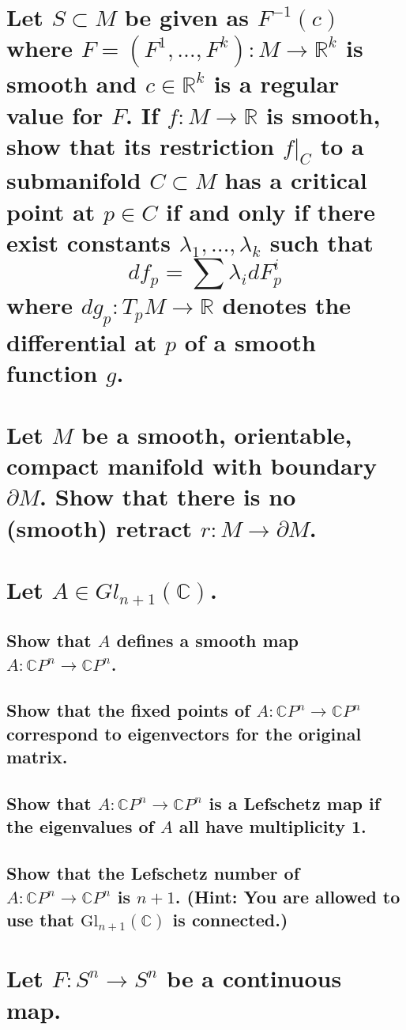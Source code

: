 \documentclass[10pt]{article}
\newcommand{\cp}[1]{\ensuremath{\mathbb{C}P^{#1}}}
\newcommand{\gl}[2]{\ensuremath{\mbox{Gl}_{#1}(#2)}}
\newcommand{\hint}[1]{(Hint: #1)}
\begin{document}
\section{Let $S \subset M$ be given as $F^{-1} (c)$ where $F = (F^1 , \dots, F^k) : M \to
  \mathbb{R}^k$ is smooth and $c \in \mathbb{R}^k$ is a regular value for $F$. If $f: M \to
  \mathbb{R}$ is smooth, show that its restriction $f|_C$ to a submanifold $C \subset M$ has a
  critical point at $p \in C$ if and only if there exist constants $\lambda_1, \dots, \lambda_k$
  such that
  $$df_p = \sum \lambda_i dF_p^i$$
  where $dg_p : T_p M \to \mathbb{R}$ denotes the differential at $p$ of a smooth function $g$.}

\section{Let $M$ be a smooth, orientable, compact manifold with boundary $\partial M$. Show that
  there is no (smooth) retract $r: M \to \partial M$. }

\section{Let $A \in Gl_{n+1}(\mathbb{C})$.}

\subsection{Show that $A$ defines a smooth map $A: \mathbb{C}P^n \to \mathbb{C}P^n$.}

\subsection{Show that the fixed points of $A: \cp{n} \to \cp{n}$ correspond to eigenvectors for the
  original matrix.}

\subsection{Show that $A : \cp{n} \to \cp{n}$ is a Lefschetz map if the eigenvalues of $A$ all have
  multiplicity 1.}

\subsection{Show that the Lefschetz number of $A: \cp{n} \to \cp{n}$ is $n+1$. \hint{You are allowed
  to use that \gl{n+1}{\mathbb{C}} is connected.}}

\section{Let $F: S^n \to S^n$ be a continuous map.}
\end{document}
